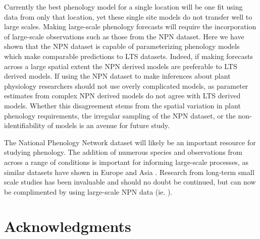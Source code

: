 \documentclass[fleqn,10pt,lineno]{wlpeerj} %
\begin{document}
Currently the best phenology model for a single location will be one fit using data from only that location, yet these single site models do not transfer well to large scales. Making large-scale phenology forecasts will require the incorporation of large-scale observations such as those from the NPN dataset. Here we have shown that the NPN dataset is capable of parameterizing phenology models which make comparable predictions to LTS datasets. Indeed, if making forecasts across a large spatial extent the NPN derived models are preferable to LTS derived models. If using the NPN dataset to make inferences about plant physiology researchers should not use overly complicated models, as parameter estimates from complex NPN derived models do not agree with LTS derived models. Whether this disagreement stems from the spatial variation in plant phenology requirements, the irregular sampling of the NPN dataset, or the non-identifiability of models is an avenue for future study. 

The National Phenology Network dataset will likely be an important resource for studying phenology. The addition of numerous species and observations from across a range of conditions is important for informing large-scale processes, as similar datasets have shown in Europe \citep{olsson2014, basler2016} and Asia \citep{xu2013, zhang2017}. Research from long-term small scale studies has been invaluable and should no doubt be continued, but can now be complimented by using large-scale NPN data (ie. \citep{jeong2013, melaas2016}).

\section*{Acknowledgments}



\setcounter{figure}{0}    
\end{document}
